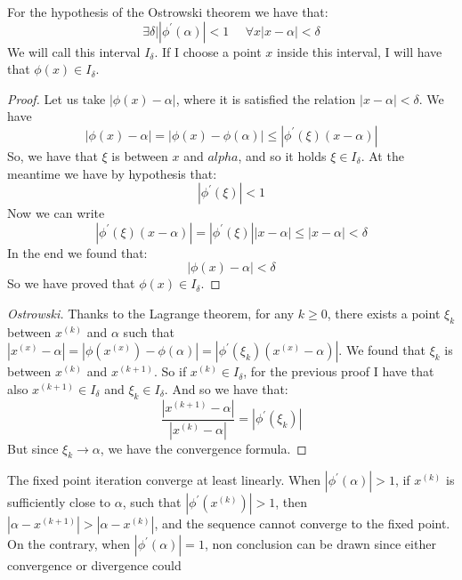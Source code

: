 \documentclass[12pt, a4paper]{report}
\begin{document}
    For the hypothesis of the Ostrowski theorem we have that: 
    \[\exists \delta | \left\lvert \phi^{'}(\alpha) \right\rvert < 1 \:\:\:\:\:\: \forall x \left\lvert x - \alpha \right\rvert < \delta\]
    We will call this interval $I_{\delta}$. If I choose a point $x$ inside this interval, I will have that $\phi(x) \in I_{\delta}$. 
    \begin{proof}
        Let us take $\left\lvert \phi(x)-\alpha \right\rvert$, where it is satisfied the relation $\left\lvert x- \alpha \right\rvert < \delta$. We have
        \[\left\lvert \phi(x)-\alpha \right\rvert=\left\lvert \phi(x)-\phi(\alpha) \right\rvert \leq \left\lvert \phi^{'}(\xi)(x-\alpha) \right\rvert \]
        So, we have that $\xi$ is between $x$ and $alpha$, and so it holds $\xi \in I_{\delta}$. At the meantime we have by hypothesis that: 
        \[\left\lvert \phi^{'}(\xi) \right\rvert < 1\]
        Now we can write 
        \[\left\lvert \phi^{'}(\xi)(x-\alpha) \right\rvert = \left\lvert \phi^{'}(\xi) \right\rvert \left\lvert x-\alpha \right\rvert \leq \left\lvert x-\alpha \right\rvert < \delta\]
        In the end we found that: 
        \[\left\lvert \phi(x)-\alpha \right\rvert < \delta\]
        So we have proved that $\phi(x) \in I_{\delta}$. 
    \end{proof}
    \begin{proof}[Ostrowski]
        Thanks to the Lagrange theorem, for any $k \geq 0$, there exists a point $\xi_k$ between $x^{(k)}$ and $\alpha$ such that $\left\lvert x^{(x)}-\alpha\right\rvert =
        \left\lvert \phi(x^{(x)})-\phi(\alpha)\right\rvert = \left\lvert \phi^{'}(\xi_k)(x^{(x)}-\alpha)\right\rvert $. We found that $\xi_k$ is between $x^{(k)}$ and $x^{(k+1)}$. 
        So if $x^{(k)} \in I_{\delta}$, for the previous proof I have that also $x^{(k+1)} \in I_{\delta}$ and $\xi_k \in I_{\delta}$. And so we have that: 
        \[\dfrac{\left\lvert x^{(k+1)}-\alpha\right\rvert }{\left\lvert x^{(k)}-\alpha\right\rvert }=\left\lvert \phi^{'}(\xi_k)\right\rvert \]
        But since $\xi_k \rightarrow \alpha$, we have the convergence formula. 
    \end{proof}
    The fixed point iteration converge at least linearly. When $\left\lvert \phi^{'}(\alpha) \right\rvert > 1$, if $x^{(k)}$ is sufficiently close to $\alpha$, such that 
    $\left\lvert \phi^{'}(x^{(k)}) \right\rvert > 1$, then $\left\lvert \alpha - x^{(k+1)} \right\rvert > \left\lvert \alpha - x^{(k)} \right\rvert$, and the sequence cannot 
    converge to the fixed point. On the contrary, when $\left\lvert \phi^{'}(\alpha) \right\rvert = 1$, non conclusion can be drawn since either convergence or divergence could 
\end{document}
